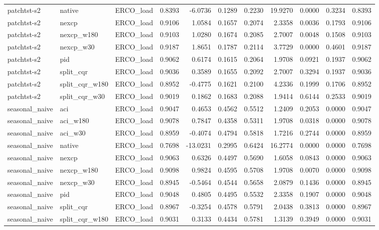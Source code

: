 \begin{tabular}{lllrrrrrrrr}
patchtst-s2 & native & ERCO_load & 0.8393 & -6.0736 & 0.1289 & 0.2230 & 19.9270 & 0.0000 & 0.3234 & 0.8393 \\
patchtst-s2 & nexcp & ERCO_load & 0.9106 & 1.0584 & 0.1657 & 0.2074 & 2.3358 & 0.0036 & 0.1793 & 0.9106 \\
patchtst-s2 & nexcp_w180 & ERCO_load & 0.9103 & 1.0280 & 0.1674 & 0.2085 & 2.7007 & 0.0048 & 0.1508 & 0.9103 \\
patchtst-s2 & nexcp_w30 & ERCO_load & 0.9187 & 1.8651 & 0.1787 & 0.2114 & 3.7729 & 0.0000 & 0.4601 & 0.9187 \\
patchtst-s2 & pid & ERCO_load & 0.9062 & 0.6174 & 0.1615 & 0.2064 & 1.9708 & 0.0921 & 0.1937 & 0.9062 \\
patchtst-s2 & split_cqr & ERCO_load & 0.9036 & 0.3589 & 0.1655 & 0.2092 & 2.7007 & 0.3294 & 0.1937 & 0.9036 \\
patchtst-s2 & split_cqr_w180 & ERCO_load & 0.8952 & -0.4775 & 0.1621 & 0.2100 & 4.2336 & 0.1999 & 0.1706 & 0.8952 \\
patchtst-s2 & split_cqr_w30 & ERCO_load & 0.9019 & 0.1862 & 0.1683 & 0.2088 & 1.9414 & 0.6144 & 0.2533 & 0.9019 \\
seasonal_naive & aci & ERCO_load & 0.9047 & 0.4653 & 0.4562 & 0.5512 & 1.2409 & 0.2053 & 0.0000 & 0.9047 \\
seasonal_naive & aci_w180 & ERCO_load & 0.9078 & 0.7847 & 0.4358 & 0.5311 & 1.9708 & 0.0318 & 0.0000 & 0.9078 \\
seasonal_naive & aci_w30 & ERCO_load & 0.8959 & -0.4074 & 0.4794 & 0.5818 & 1.7216 & 0.2744 & 0.0000 & 0.8959 \\
seasonal_naive & native & ERCO_load & 0.7698 & -13.0231 & 0.2995 & 0.6424 & 16.2774 & 0.0000 & 0.0000 & 0.7698 \\
seasonal_naive & nexcp & ERCO_load & 0.9063 & 0.6326 & 0.4497 & 0.5690 & 1.6058 & 0.0843 & 0.0000 & 0.9063 \\
seasonal_naive & nexcp_w180 & ERCO_load & 0.9098 & 0.9824 & 0.4595 & 0.5708 & 1.9708 & 0.0070 & 0.0000 & 0.9098 \\
seasonal_naive & nexcp_w30 & ERCO_load & 0.8945 & -0.5464 & 0.4544 & 0.5658 & 2.0879 & 0.1436 & 0.0000 & 0.8945 \\
seasonal_naive & pid & ERCO_load & 0.9048 & 0.4805 & 0.4495 & 0.5532 & 2.3358 & 0.1907 & 0.0000 & 0.9048 \\
seasonal_naive & split_cqr & ERCO_load & 0.8967 & -0.3254 & 0.4578 & 0.5791 & 2.0438 & 0.3813 & 0.0000 & 0.8967 \\
seasonal_naive & split_cqr_w180 & ERCO_load & 0.9031 & 0.3133 & 0.4434 & 0.5781 & 1.3139 & 0.3949 & 0.0000 & 0.9031 \\

\end{tabular}
